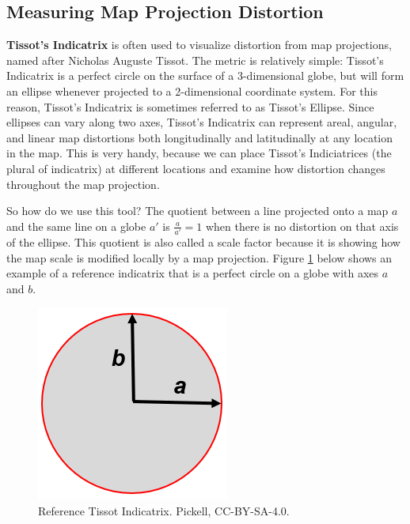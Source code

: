 \documentclass[
]{book}
\begin{document}
\hypertarget{measuring-map-projection-distortion}{%
\subsection{Measuring Map Projection Distortion}\label{measuring-map-projection-distortion}}

\textbf{Tissot's Indicatrix} is often used to visualize distortion from map projections, named after Nicholas Auguste Tissot. The metric is relatively simple: Tissot's Indicatrix is a perfect circle on the surface of a 3-dimensional globe, but will form an ellipse whenever projected to a 2-dimensional coordinate system. For this reason, Tissot's Indicatrix is sometimes referred to as Tissot's Ellipse. Since ellipses can vary along two axes, Tissot's Indicatrix can represent areal, angular, and linear map distortions both longitudinally and latitudinally at any location in the map. This is very handy, because we can place Tissot's Indiciatrices (the plural of indicatrix) at different locations and examine how distortion changes throughout the map projection.

So how do we use this tool? The quotient between a line projected onto a map \(a\) and the same line on a globe \(a'\) is \(\frac{a}{a'}=1\) when there is no distortion on that axis of the ellipse. This quotient is also called a scale factor because it is showing how the map scale is modified locally by a map projection. Figure \ref{fig:2-reference-indicatrix} below shows an example of a reference indicatrix that is a perfect circle on a globe with axes \(a\) and \(b\).

\begin{figure}
\includegraphics[width=0.75\linewidth]{images/02-reference-indicatrix} \caption{Reference Tissot Indicatrix. Pickell, CC-BY-SA-4.0.}\label{fig:2-reference-indicatrix}
\end{figure}
\end{document}

